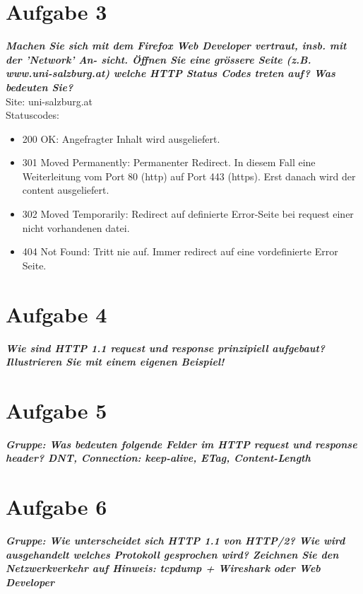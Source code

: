 \documentclass[12pt, a4paper]{report}
\begin{document}
\section*{Aufgabe 3}
\textbf{\textit{Machen Sie sich mit dem Firefox Web Developer vertraut, insb. mit der ’Network’ An-
sicht. Öffnen Sie eine grössere Seite (z.B. www.uni-salzburg.at) welche HTTP Status
Codes treten auf? Was bedeuten Sie?}}\\
Site: uni-salzburg.at\\
Statuscodes:
\begin{itemize}
	\item 200 OK: Angefragter Inhalt wird ausgeliefert.
	\item 301 Moved Permanently: Permanenter Redirect. In diesem Fall eine Weiterleitung vom Port 80 (http) auf Port 443
	(https). Erst danach wird der content ausgeliefert.
	\item 302 Moved Temporarily: Redirect auf definierte Error-Seite bei request einer nicht vorhandenen datei.
	\item 404 Not Found: Tritt nie auf. Immer redirect auf eine vordefinierte Error Seite.
\end{itemize}

\section*{Aufgabe 4}
\textbf{\textit{Wie sind HTTP 1.1 request und response prinzipiell aufgebaut? Illustrieren Sie mit einem
eigenen Beispiel!}}

\section*{Aufgabe 5}
\textbf{\textit{Gruppe: Was bedeuten folgende Felder im HTTP request und response header? DNT,
Connection: keep-alive, ETag, Content-Length}}

\section*{Aufgabe 6}
\textbf{\textit{Gruppe: Wie unterscheidet sich HTTP 1.1 von HTTP/2? Wie wird ausgehandelt welches
Protokoll gesprochen wird? Zeichnen Sie den Netzwerkverkehr auf Hinweis: tcpdump +
Wireshark oder Web Developer}}
\end{document}
